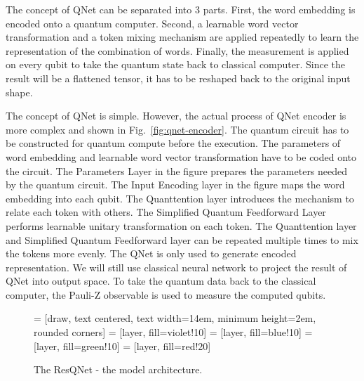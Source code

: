 The concept of QNet can be separated into 3 parts. First, the word embedding is encoded onto a quantum computer. Second, a learnable word vector transformation and a token mixing mechanism are applied repeatedly to learn the representation of the combination of words. Finally, the measurement is applied on every qubit to take the quantum state back to classical computer. Since the result will be a flattened tensor, it has to be reshaped back to the original input shape.

The concept of QNet is simple. However, the actual process of QNet encoder is more complex and shown in Fig.~\ref{fig:qnet-encoder}. The quantum circuit has to be constructed for quantum compute before the execution. The parameters of word embedding and learnable word vector transformation have to be coded onto the circuit. The Parameters Layer in the figure prepares the parameters needed by the quantum circuit. The Input Encoding layer in the figure maps the word embedding into each qubit. The Quanttention layer introduces the mechanism to relate each token with others. The Simplified Quantum Feedforward Layer performs learnable unitary transformation on each token. The Quanttention layer and Simplified Quantum Feedforward layer can be repeated multiple times to mix the tokens more evenly. The QNet is only used to generate encoded representation. We will still use classical neural network to project the result of QNet into output space. To take the quantum data back to the classical computer, the Pauli-Z observable is used to measure the computed qubits.

\begin{figure}[htp!]
  \centering
     = [draw, text centered, text width=14em, minimum height=2em, rounded corners]
     = [layer, fill=violet!10]
     = [layer, fill=blue!10]
     = [layer, fill=green!10]
     = [layer, fill=red!20]
  \caption{The ResQNet - the model architecture.}
  \label{fig:resqnet}
\end{figure}

